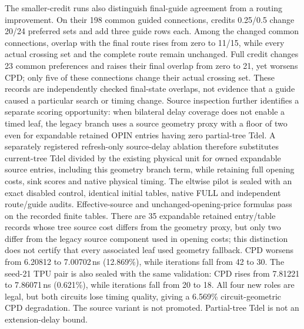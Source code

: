\documentclass[conference,10pt]{IEEEtran}
\begin{document}
The smaller-credit runs also distinguish final-guide agreement from a routing improvement. On their 198 common guided connections, credits 0.25/0.5 change 20/24 preferred sets and add three guide rows each. Among the changed common connections, overlap with the final route rises from zero to 11/15, while every actual crossing set and the complete route remain unchanged. Full credit changes 23 common preferences and raises their final overlap from zero to 21, yet worsens CPD; only five of these connections change their actual crossing set. These records are independently checked final-state overlaps, not evidence that a guide caused a particular search or timing change. Source inspection further identifies a separate scoring opportunity: when bilateral delay coverage does not enable a timed leaf, the legacy branch uses a source geometry proxy with a floor of two even for expandable retained OPIN entries having zero partial-tree Tdel. A separately registered refresh-only source-delay ablation therefore substitutes current-tree Tdel divided by the existing physical unit for owned expandable source entries, including this geometry branch term, while retaining full opening costs, sink scores and native physical timing. The eltwise pilot is sealed with an exact disabled control, identical initial tables, native FULL and independent route/guide audits. Effective-source and unchanged-opening-price formulas pass on the recorded finite tables. There are 35 expandable retained entry/table records whose tree source cost differs from the geometry proxy, but only two differ from the legacy source component used in opening costs; this distinction does not certify that every associated leaf used geometry fallback. CPD worsens from 6.20812 to 7.00702\,ns (12.869\%), while iterations fall from 42 to 30. The seed-21 TPU pair is also sealed with the same validation: CPD rises from 7.81221 to 7.86071\,ns (0.621\%), while iterations fall from 20 to 18. All four new roles are legal, but both circuits lose timing quality, giving a 6.569\% circuit-geometric CPD degradation. The source variant is not promoted. Partial-tree Tdel is not an extension-delay bound.
\end{document}
